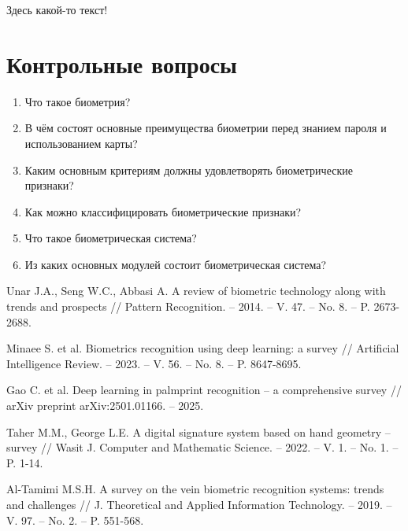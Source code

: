\documentclass[12pt]{book}
\begin{document}
\large{Здесь какой-то текст!

\section*{Контрольные вопросы}

\large{

\begin{enumerate}
\item Что такое биометрия?
\item В чём состоят основные преимущества биометрии перед знанием пароля и использованием карты?
\item Каким основным критериям должны удовлетворять биометрические признаки?
\item Как можно классифицировать биометрические признаки?
\item Что такое биометрическая система?
\item Из каких основных модулей состоит биометрическая система?
\end{enumerate}

}

\renewcommand{\bibname}{Список литературы}

\vspace{0mm}

\begin{thebibliography}{11}
    \thispagestyle{fancy}
    \addcontentsline{toc}{section}{\bibname}
    
     Unar J.A., Seng W.C., Abbasi A. A review of biometric technology along with trends and prospects // Pattern Recognition. -- 2014. -- V. 47. -- No. 8. -- P. 2673-2688.

     Minaee S. et al. Biometrics recognition using deep learning: a survey // Artificial Intelligence Review. -- 2023. -- V. 56. -- No. 8. -- P. 8647-8695.

     Gao C. et al. Deep learning in palmprint recognition -- a comprehensive survey // arXiv preprint arXiv:2501.01166. -- 2025.

     Taher M.M., George L.E. A digital signature system based on hand geometry -- survey // Wasit J. Computer and Mathematic Science. -- 2022. -- V. 1. -- No. 1. -- P. 1-14.

     Al-Tamimi M.S.H. A survey on the vein biometric recognition systems: trends and challenges // J. Theoretical and Applied Information Technology. -- 2019. -- V. 97. -- No. 2. -- P. 551-568.


\end{thebibliography}}
\end{document}

